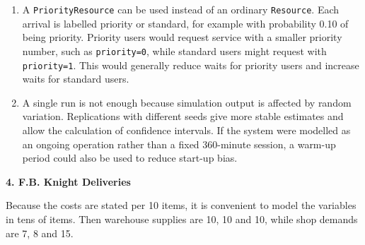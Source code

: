 \documentclass[11pt,a4paper]{article}
\begin{document}
\begin{enumerate}
The target is 97\% waiting less than 8 minutes.
The minimum staffing level that meets the target is therefore 3 advisers.

\item A \texttt{PriorityResource} can be used instead of an ordinary \texttt{Resource}.
Each arrival is labelled priority or standard, for example with probability 0.10 of being priority.
Priority users would request service with a smaller priority number, such as \texttt{priority=0}, while standard users might request with \texttt{priority=1}.
This would generally reduce waits for priority users and increase waits for standard users.

\item A single run is not enough because simulation output is affected by random variation.
Replications with different seeds give more stable estimates and allow the calculation of confidence intervals.
If the system were modelled as an ongoing operation rather than a fixed 360-minute session, a warm-up period could also be used to reduce start-up bias.
\end{enumerate}

\newpage

\textbf{4. F.B. Knight Deliveries}

Because the costs are stated per 10 items, it is convenient to model the variables in tens of items.
Then warehouse supplies are 10, 10 and 10, while shop demands are 7, 8 and 15.
\end{document}
